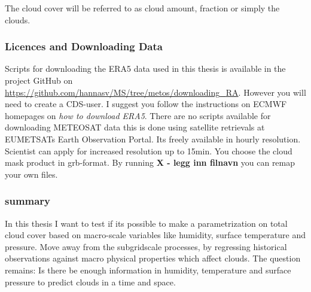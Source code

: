 The cloud cover will be referred to as cloud amount, fraction or simply the clouds.
\subsubsection{Licences and Downloading Data} \label{sec:downloading_data}
Scripts for downloading the ERA5 data used in this thesis is available in the project GitHub on \href{https://github.com/hannasv/MS/tree/metos/downloading{\_}RA}{https://github.com/hannasv/MS/tree/metos/downloading{\_}RA}. However you will need to create a CDS-user. I suggest you follow the instructions on ECMWF homepages on \textit{how to download ERA5}. 
There are no scripts available for downloading METEOSAT data this is done using satellite retrievals at EUMETSATs Earth Observation Portal. Its freely available in hourly resolution. Scientist can apply for increased resolution up to 15min. You choose the cloud mask product in grb-format. By running \textbf{X - legg inn filnavn} you can remap your own files.

\subsubsection{summary}
In this thesis I want to test if its possible to make a parametrization on total cloud cover based on macro-scale variables like humidity, surface temperature and pressure. Move away from the subgridscale processes, by regressing historical observations against macro physical properties which affect clouds. The question remains: Is there be enough information in humidity, temperature and surface pressure to predict clouds in a time and space. 

